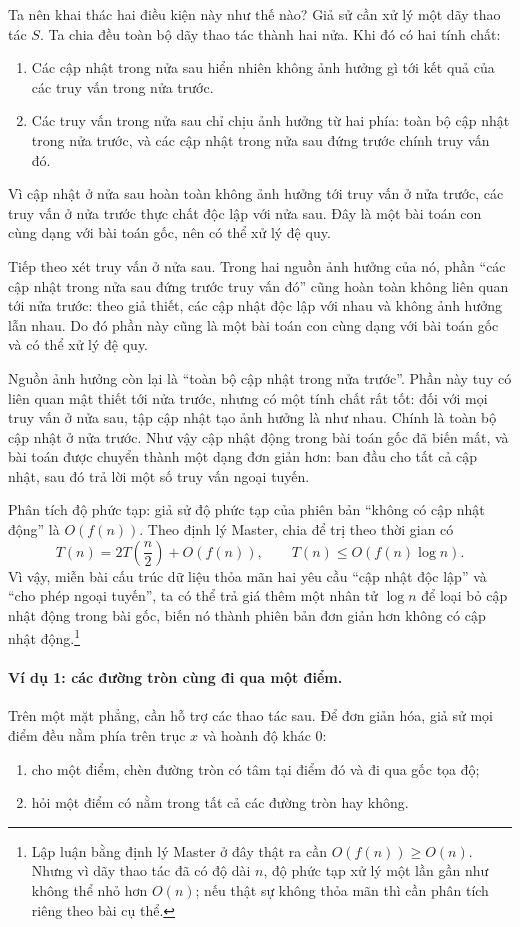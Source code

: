 \documentclass[11pt]{article}
\begin{document}
Ta nên khai thác hai điều kiện này như thế nào? Giả sử cần xử lý một dãy
thao tác \(S\). Ta chia đều toàn bộ dãy thao tác thành hai nửa. Khi đó có hai
tính chất:
\begin{enumerate}
  \item Các cập nhật trong nửa sau hiển nhiên không ảnh hưởng gì tới kết quả
  của các truy vấn trong nửa trước.
  \item Các truy vấn trong nửa sau chỉ chịu ảnh hưởng từ hai phía: toàn bộ
  cập nhật trong nửa trước, và các cập nhật trong nửa sau đứng trước chính
  truy vấn đó.
\end{enumerate}

Vì cập nhật ở nửa sau hoàn toàn không ảnh hưởng tới truy vấn ở nửa trước,
các truy vấn ở nửa trước thực chất độc lập với nửa sau. Đây là một bài toán
con cùng dạng với bài toán gốc, nên có thể xử lý đệ quy.

Tiếp theo xét truy vấn ở nửa sau. Trong hai nguồn ảnh hưởng của nó, phần
``các cập nhật trong nửa sau đứng trước truy vấn đó'' cũng hoàn toàn không
liên quan tới nửa trước: theo giả thiết, các cập nhật độc lập với nhau và
không ảnh hưởng lẫn nhau. Do đó phần này cũng là một bài toán con cùng dạng
với bài toán gốc và có thể xử lý đệ quy.

Nguồn ảnh hưởng còn lại là ``toàn bộ cập nhật trong nửa trước''. Phần này
tuy có liên quan mật thiết tới nửa trước, nhưng có một tính chất rất tốt:
đối với mọi truy vấn ở nửa sau, tập cập nhật tạo ảnh hưởng là như nhau. Chính
là toàn bộ cập nhật ở nửa trước. Như vậy cập nhật động trong bài toán gốc đã
biến mất, và bài toán được chuyển thành một dạng đơn giản hơn: ban đầu cho
tất cả cập nhật, sau đó trả lời một số truy vấn ngoại tuyến.

Phân tích độ phức tạp: giả sử độ phức tạp của phiên bản ``không có cập nhật
động'' là \(O(f(n))\). Theo định lý Master, chia để trị theo thời gian có
\[
  T(n)=2T\!\left(\frac n2\right)+O(f(n)),
  \qquad
  T(n)\le O(f(n)\log n).
\]
Vì vậy, miễn bài cấu trúc dữ liệu thỏa mãn hai yêu cầu ``cập nhật độc lập''
và ``cho phép ngoại tuyến'', ta có thể trả giá thêm một nhân tử \(\log n\)
để loại bỏ cập nhật động trong bài gốc, biến nó thành phiên bản đơn giản hơn
không có cập nhật động.\footnote{Lập luận bằng định lý Master ở đây thật ra
cần \(O(f(n))\ge O(n)\). Nhưng vì dãy thao tác đã có độ dài \(n\), độ phức
tạp xử lý một lần gần như không thể nhỏ hơn \(O(n)\); nếu thật sự không thỏa
mãn thì cần phân tích riêng theo bài cụ thể.}

\paragraph{Ví dụ 1: các đường tròn cùng đi qua một điểm.}
Trên một mặt phẳng, cần hỗ trợ các thao tác sau. Để đơn giản hóa, giả sử mọi
điểm đều nằm phía trên trục \(x\) và hoành độ khác \(0\):
\begin{enumerate}
  \item cho một điểm, chèn đường tròn có tâm tại điểm đó và đi qua gốc tọa
  độ;
  \item hỏi một điểm có nằm trong tất cả các đường tròn hay không.
\end{enumerate}
\end{document}
